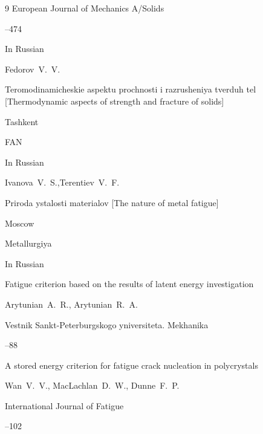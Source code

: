 \begin{thebibliography}{9}
\jour European Journal of Mechanics A/Solids



--474




\lang In Russian

\by Fedorov~V.~V.

\book Teromodinamicheskie aspektu prochnosti i razrusheniya tverduh tel [Thermodynamic aspects of strength and fracture of solids]

\publaddr Tashkent

\publ FAN






\lang In Russian

\by Ivanova~V.~S.,Terentiev~V.~F.

\book Priroda ystalosti materialov [The nature of metal fatigue]

\publaddr Moscow

\publ Metallurgiya






\lang In Russian

\paper Fatigue criterion based on the results of latent energy investigation

\by Arytunian~A.~R., Arytunian~R.~A.

\jour Vestnik Sankt-Peterburgskogo yniversiteta. Mekhanika



--88




\paper A stored energy criterion for fatigue crack nucleation in polycrystals

\by Wan~V.~V., MacLachlan~D.~W., Dunne~F.~P.

\jour International Journal of Fatigue



--102




\end{thebibliography}
